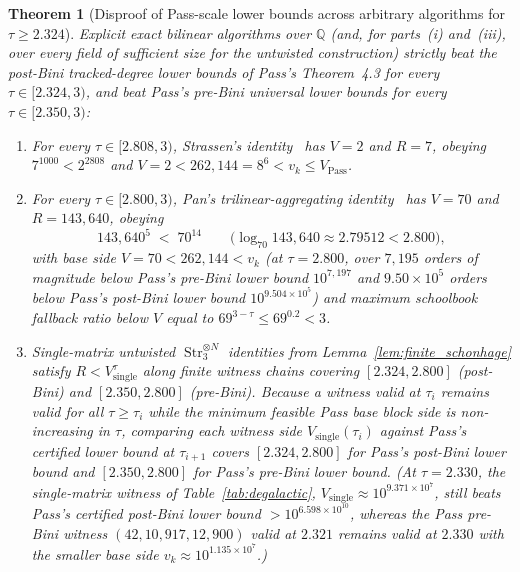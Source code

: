 \documentclass[11pt,a4paper]{article}
\theoremstyle{plain}
\newtheorem{theorem}{Theorem}[section]
\theoremstyle{definition}
\theoremstyle{remark}
\newcommand{\Q}{\mathbb{Q}}
\DeclareMathOperator{\Str}{Str}
\begin{document}
\begin{theorem}[Disproof of Pass-scale lower bounds across arbitrary algorithms for $\tau \ge 2.324$]
\label{thm:disproof_arbitrary}
Explicit exact bilinear algorithms over $\Q$ (and, for parts~(i) and~(iii), over every field of sufficient size for the untwisted construction) strictly beat the post-Bini tracked-degree lower bounds of Pass's Theorem~4.3 for every $\tau \in [2.324, 3)$, and beat Pass's pre-Bini universal lower bounds for every $\tau \in [2.350, 3)$:
\begin{enumerate}[label=(\roman*)]
\item For every $\tau \in [2.808, 3)$, Strassen's identity~\cite{Strassen1969} has $V = 2$ and $R = 7$, obeying $7^{1000} < 2^{2808}$ and $V = 2 < 262{,}144 = 8^6 < v_k \le V_{\mathrm{Pass}}$.
\item For every $\tau \in [2.800, 3)$, Pan's trilinear-aggregating identity~\cite{Pan1978,Pan2018} has $V = 70$ and $R = 143{,}640$, obeying
\begin{equation}
    143{,}640^5 \;<\; 70^{14} \qquad\bigl(\log_{70} 143{,}640 \approx 2.79512 < 2.800\bigr) ,
    \label{eq:pan_counterexample}
\end{equation}
with base side $V = 70 < 262{,}144 < v_k$ (at $\tau = 2.800$, over $7{,}195$ orders of magnitude below Pass's pre-Bini lower bound $10^{7{,}197}$ and $9.50 \times 10^5$ orders below Pass's post-Bini lower bound $10^{9.504 \times 10^5}$) and maximum schoolbook fallback ratio below $V$ equal to $69^{3 - \tau} \le 69^{0.2} < 3$.
\item Single-matrix untwisted $\Str_3^{\otimes N}$ identities from Lemma~\ref{lem:finite_schonhage} satisfy $R < V_{\mathrm{single}}^\tau$ along finite witness chains covering $[2.324, 2.800]$ (post-Bini) and $[2.350, 2.800]$ (pre-Bini). Because a witness valid at $\tau_i$ remains valid for all $\tau \ge \tau_i$ while the minimum feasible Pass base block side is non-increasing in $\tau$, comparing each witness side $V_{\mathrm{single}}(\tau_i)$ against Pass's certified lower bound at $\tau_{i+1}$ covers $[2.324, 2.800]$ for Pass's post-Bini lower bound and $[2.350, 2.800]$ for Pass's pre-Bini lower bound. (At $\tau = 2.330$, the single-matrix witness of Table~\ref{tab:degalactic}, $V_{\mathrm{single}} \approx 10^{9.371 \times 10^7}$, still beats Pass's certified post-Bini lower bound $> 10^{6.598 \times 10^{10}}$, whereas the Pass pre-Bini witness $(42, 10{,}917, 12{,}900)$ valid at $2.321$ remains valid at $2.330$ with the smaller base side $v_k \approx 10^{1.135 \times 10^7}$.)
\end{enumerate}
\end{theorem}
\end{document}
